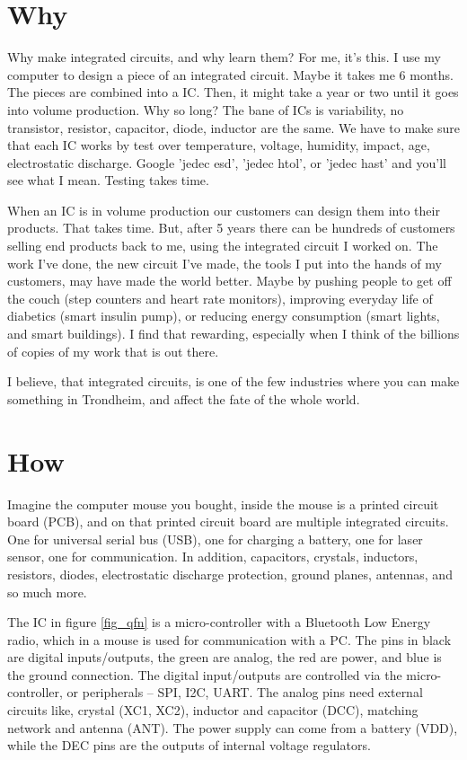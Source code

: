 \documentclass[technote,10pt,a4paper]{IEEEtran}
\begin{document}
\section{Why}
Why make integrated circuits, and why learn them? For me, it's this. I use my
computer to design a piece of an integrated circuit. Maybe it takes me 6
months. The pieces are combined into a IC. Then, it might take a year or two
until it goes into volume production. Why so long? The bane of ICs is
variability, no transistor, resistor, capacitor, diode, inductor are the same.
We have to make sure that each IC works by test over temperature, voltage,
humidity, impact, age, electrostatic discharge. Google 'jedec esd', 'jedec
htol', or 'jedec hast' and you'll see what I mean. Testing takes time.

When an IC is in volume production our customers can design them into their
products. That takes time. But, after 5 years there can be hundreds of customers selling end products back to
me, using the integrated circuit I worked on.
The work I've done, the new circuit I've made, the tools I put into
the hands of my customers, may have made the world better. Maybe by pushing
people to get off the couch (step counters and heart rate monitors), improving
everyday life of diabetics (smart insulin pump), or reducing energy consumption
(smart lights, and smart buildings). I find that rewarding, especially when I
think of the billions of copies of my work that is out there.

I believe, that integrated circuits, is one of the few industries where you can make
something in Trondheim, and affect the fate of the whole world.

\section{How}


Imagine the computer
mouse you bought, inside the mouse is a printed
circuit board (PCB), and on that printed circuit board are multiple integrated
circuits. One for universal serial bus (USB), one for charging a battery, one for laser
sensor, one for communication. In addition, capacitors, crystals, inductors,
resistors, diodes, electrostatic discharge protection, ground planes, antennas,
and so much more.

The IC in figure \ref{fig_qfn} is a micro-controller
with a Bluetooth Low Energy radio, which in a mouse is used for communication
with a PC. The pins in black are digital inputs/outputs, the green are analog, the red are power, and blue is the ground connection.
The digital input/outputs are controlled via the micro-controller, or peripherals -- SPI, I2C,
UART. The analog pins  need external circuits like, crystal
(XC1, XC2), inductor and capacitor (DCC), matching network and antenna (ANT).
The power supply can come from a battery (VDD), while the DEC pins are the
outputs of internal voltage regulators.
\end{document}
